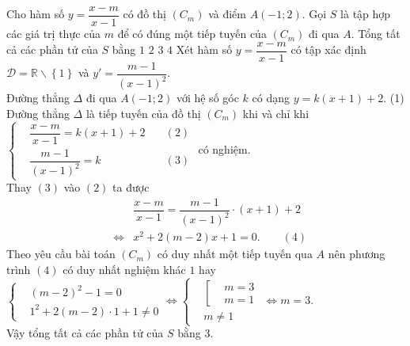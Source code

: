 \documentclass[12pt,a4paper,oneside]{book}
\newcommand{\hoac}[1]{ 
	\left[\begin{aligned}#1\end{aligned}\right.}
\newcommand{\heva}[1]{
	\left\{\begin{aligned}#1\end{aligned}\right.}
\begin{document}
\begin{ex}%
Cho hàm số $ y = \dfrac{x-m}{x-1} $ có đồ thị $ \left(C_m\right) $	và điểm $ A(-1;2) $. Gọi $ S $ là tập hợp các giá trị thực của $ m $ để có đúng một tiếp tuyến của $ \left(C_m\right) $ đi qua $ A $. Tổng tất cả các phần tử của $ S $ bằng
	\choice
	{$ 1 $}
	{$ 2 $}
	{\True $ 3 $}
	{$ 4 $}
	\loigiai
	{Xét hàm số $ y = \dfrac{x-m}{x-1} $ có tập xác định $ \mathscr{D}=\mathbb{R}\backslash \left\{1\right\} $ và $ y'=\dfrac{m-1}{\left(x-1\right)^2} $.\\
		Đường thẳng $ \Delta $ đi qua $ A(-1;2) $ với hệ số góc $k$ có dạng $ y = k(x+1)+2. $ \hfill(1)\\
		Đường thẳng $ \Delta $ là tiếp tuyến của đồ thị $ \left(C_m\right) $ khi và chỉ khi $ \heva{&\dfrac{x-m}{x-1}=k(x+1)+2 &\quad (2)\\&\dfrac{m-1}{\left(x-1\right)^2}=k &\quad (3)} $ có nghiệm.\\
		Thay $ (3) $ vào $ (2) $ ta được 
		\begin{eqnarray*}
&&\dfrac{x-m}{x-1}=\dfrac{m-1}{\left(x-1\right)^2} \cdot (x+1) + 2\\
&\Leftrightarrow& x^2 + 2(m-2)x+1=0. \quad \quad(4)
	\end{eqnarray*}
Theo yêu cầu bài toán $ \left(C_m\right) $ có duy nhất một tiếp tuyến qua $ A $ nên phương trình $ (4) $ có duy nhất nghiệm khác $ 1 $ hay $ \heva{&(m-2)^2-1=0\\&1^2+2(m-2)\cdot 1 + 1 \ne 0} \Leftrightarrow \heva{&\hoac{&m=3\\&m=1}\\&m \ne 1}
\Leftrightarrow m = 3.$
\\Vậy tổng tất cả các phần tử của $ S $ bằng $ 3. $}
\end{ex}
\end{document}
